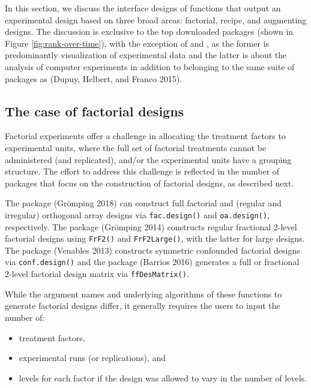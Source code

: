 In this section, we discuss the interface designs of functions that output an experimental design based on three broad areas: factorial, recipe, and augmenting designs. The discussion is exclusive to the top downloaded packages (shown in Figure \ref{fig:rank-over-time}), with the exception of  and , as the former is predominantly visualization of experimental data and the latter is about the analysis of computer experiments in addition to belonging to the same suite of packages as  (Dupuy, Helbert, and Franco 2015).

\hypertarget{the-case-of-factorial-designs}{%
\subsection{The case of factorial designs}\label{the-case-of-factorial-designs}}

Factorial experiments offer a challenge in allocating the treatment factors to experimental units, where the full set of factorial treatments cannot be administered (and replicated), and/or the experimental units have a grouping structure. The effort to address this challenge is reflected in the number of packages that focus on the construction of factorial designs, as described next.

The  package (Grömping 2018) can construct full factorial and (regular and irregular) orthogonal array designs via \texttt{fac.design()} and \texttt{oa.design()}, respectively. The  package (Grömping 2014) constructs regular fractional 2-level factorial designs using \texttt{FrF2()} and \texttt{FrF2Large()}, with the latter for large designs. The  package (Venables 2013) constructs symmetric confounded factorial designs via \texttt{conf.design()} and the  package (Barrios 2016) generates a full or fractional 2-level factorial design matrix via \texttt{ffDesMatrix()}.

While the argument names and underlying algorithms of these functions to generate factorial designs differ, it generally requires the users to input the number of:

\begin{itemize}
\tightlist
\item
  treatment factors,
\item
  experimental runs (or replications), and
\item
  levels for each factor if the design was allowed to vary in the number of levels.
\end{itemize}

